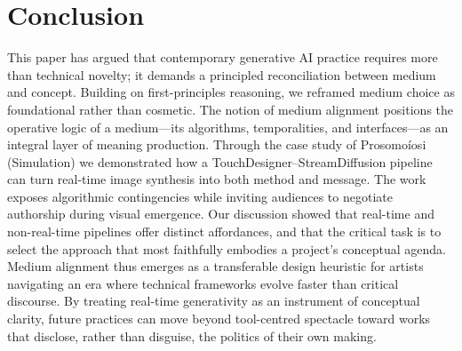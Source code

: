 \documentclass[sigconf,nonacm]{acmart}
\begin{document}
\section{Conclusion}
This paper has argued that contemporary generative AI practice requires more than technical novelty; it demands a principled reconciliation between medium and concept. Building on first-principles reasoning, we reframed medium choice as foundational rather than cosmetic. The notion of medium alignment positions the operative logic of a medium—its algorithms, temporalities, and interfaces—as an integral layer of meaning production.
Through the case study of Prosomoíosi (Simulation) we demonstrated how a TouchDesigner–StreamDiffusion pipeline can turn real-time image synthesis into both method and message. The work exposes algorithmic contingencies while inviting audiences to negotiate authorship during visual emergence. Our discussion showed that real-time and non-real-time pipelines offer distinct affordances, and that the critical task is to select the approach that most faithfully embodies a project's conceptual agenda.
Medium alignment thus emerges as a transferable design heuristic for artists navigating an era where technical frameworks evolve faster than critical discourse. By treating real-time generativity as an instrument of conceptual clarity, future practices can move beyond tool-centred spectacle toward works that disclose, rather than disguise, the politics of their own making.

\end{document}
